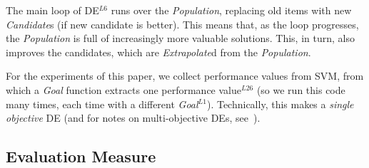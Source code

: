 The main loop of DE$^{L6}$ runs over the {\em Population}, replacing old items
with new {\em Candidate}s (if  new candidate is better).
This means that, as the loop progresses, the {\em Population} is full of increasingly
more valuable solutions. This, in turn, also improves  the candidates, which are {\em Extrapolate}d
from the {\em Population}.

For the experiments of this paper, we collect performance
values from SVM, from which a {\em Goal} function extracts one 
performance value$^{L26}$ (so we run this code many times, each time with
a different {\em Goal}$^{L1}$).  Technically, this makes a  {\em single objective} DE 
(and for notes on multi-objective DEs, see~\cite{robivc2005demo,zhang2007moea,huang2010differential}).


\subsection{Evaluation Measure}